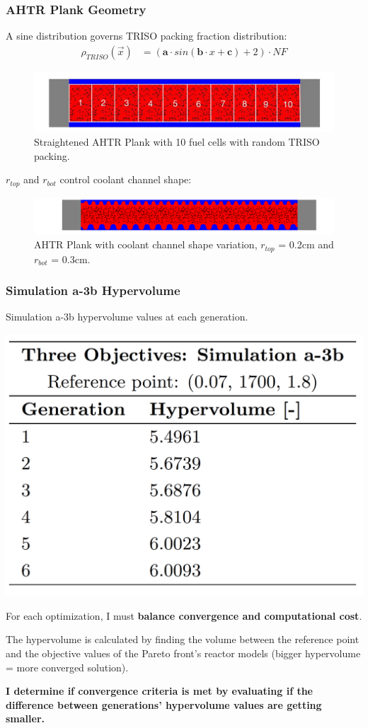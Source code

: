 \begin{frame}
    \frametitle{AHTR Plank Geometry}
    A sine distribution governs TRISO packing fraction distribution: 
    \begin{align}
        \rho_{TRISO}(\vec{x}) &= \left(\textbf{a}\cdot sin(\textbf{b}\cdot x + \textbf{c}) + 2\right) \cdot NF \nonumber
    \end{align}
    \begin{figure}
        \includegraphics[width=0.9\linewidth]{../docs/figures/straightened_plank.png} 
        \caption{Straightened AHTR Plank with 10 fuel cells with random TRISO packing.}
    \end{figure}
    $r_{top}$ and $r_{bot}$ control coolant channel shape: 
    \begin{figure}
        \includegraphics[width=\linewidth]{../docs/figures/coolant-channel-shape.png} 
        \caption{AHTR Plank with coolant channel shape variation, $r_{top}$ = 0.2cm and 
        $r_{bot}$ = 0.3cm.}
    \end{figure}
\end{frame}

\begin{frame}
    \frametitle{Simulation a-3b Hypervolume}
    \begin{table}
        \caption{Simulation a-3b hypervolume values at each generation.}
        \includegraphics[width=0.35\linewidth]{figures/a-3b-hypervolume.png} 
    \end{table}

    For each optimization, I must \textbf{balance convergence and computational cost}.

    \vspace{0.1cm}
    The hypervolume is calculated by finding the volume between the reference point and 
    the objective values of the Pareto front's reactor models (bigger hypervolume = 
    more converged solution).

    \vspace{0.1cm}
    \textbf{I determine if convergence criteria is met by evaluating if the difference between 
    generations' hypervolume values are getting smaller.}
\end{frame}